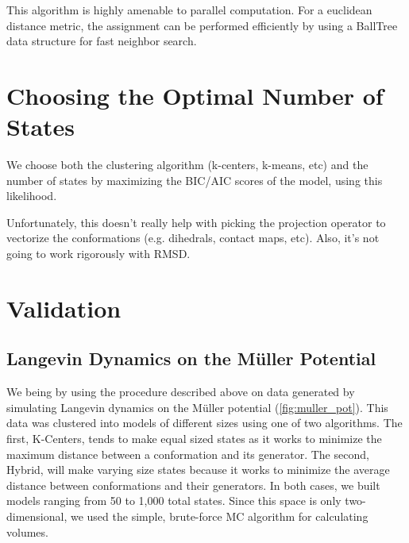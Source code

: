 \documentclass[twocolumn,floatfix,nofootinbib,aps]{revtex4-1}
\begin{document}
This algorithm is highly amenable to parallel computation. For a euclidean
distance metric, the assignment can be performed efficiently by using a BallTree 
data structure for fast neighbor search.

\section{Choosing the Optimal Number of States}

We choose both the clustering algorithm (k-centers, k-means, etc) and the
number of states by maximizing the BIC/AIC scores of the model, using this
likelihood.

Unfortunately, this doesn't really help with picking the projection operator
to vectorize the conformations (e.g. dihedrals, contact maps, etc). Also,
it's not going to work rigorously with RMSD.

\section{Validation}

\subsection{Langevin Dynamics on the M\"uller Potential}
We being by using the procedure described above on data generated by simulating Langevin dynamics on the M\"{u}ller potential (\cref{fig:muller_pot}). This data was clustered into models of different sizes using one of two algorithms. The first, K-Centers, tends to make equal sized states as it works to minimize the maximum distance between a conformation and its generator. The second, Hybrid, will make varying size states because it works to minimize the average distance between conformations and their generators. In both cases, we built models ranging from 50 to 1,000 total states. Since this space is only two-dimensional, we used the simple, brute-force MC algorithm for calculating volumes. 
\end{document}
